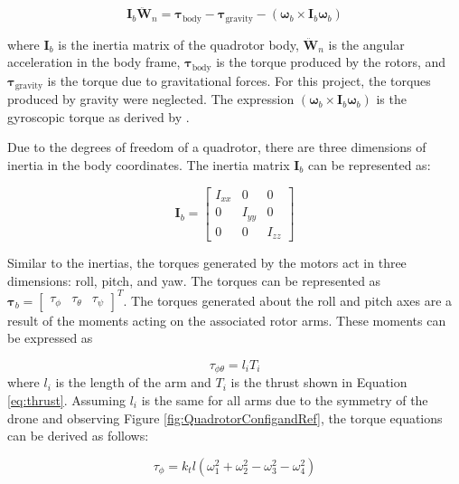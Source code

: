 \documentclass{UoNMCHA}
\numberwithin{equation}{section}
\begin{document}
\begin{equation}
    \mathbf{I}_b \ddot{\boldsymbol{W}}_n = \boldsymbol{\tau}_{\text{body}} - \boldsymbol{\tau}_{\text{gravity}} - \left( \boldsymbol{\omega}_b \times \mathbf{I}_b \boldsymbol{\omega}_b \right)
    \label{eq:MomentEq}
    \end{equation}
    
where \( \mathbf{I}_b \) is the inertia matrix of the quadrotor body, \( \ddot{\boldsymbol{W}}_n \) is the angular acceleration in the body frame, \( \boldsymbol{\tau}_{\text{body}} \) is the torque produced by the rotors, and \( \boldsymbol{\tau}_{\text{gravity}} \) is the torque due to gravitational forces. For this project, the torques produced by gravity were neglected. The expression \( \left( \boldsymbol{\omega}_b \times \mathbf{I}_b \boldsymbol{\omega}_b \right) \) is the gyroscopic torque as derived by \cite{website:AndrewGibian}.
    
Due to the degrees of freedom of a quadrotor, there are three dimensions of inertia in the body coordinates. The inertia matrix \( \mathbf{I}_b \) can be represented as:

\begin{equation}
\mathbf{I}_b = 
\begin{bmatrix}
I_{xx} & 0 & 0 \\
0 & I_{yy} & 0 \\
0 & 0 & I_{zz}
\end{bmatrix}
\end{equation}

Similar to the inertias, the torques generated by the motors act in three dimensions: roll, pitch, and yaw. The torques can be represented as \( \boldsymbol{\tau}_b = \begin{bmatrix} {\tau}_\phi & {\tau}_\theta & {\tau}_\psi \end{bmatrix}^T \). The torques generated about the roll and pitch axes are a result of the moments acting on the associated rotor arms. These moments can be expressed as 

\begin{equation}
\tau_{\phi\theta} = l_i T_i 
\end{equation}
where \( l_i \) is the length of the arm and \( T_i \) is the thrust shown in Equation \ref{eq:thrust}. Assuming \( l_i \) is the same for all arms due to the symmetry of the drone and observing Figure \ref{fig:QuadrotorConfigandRef}, the torque equations can be derived as follows:


\begin{equation}
\tau_{\phi} = k_t l (\omega_1^2 + \omega_2^2 - \omega_3^2 - \omega_4^2)
\end{equation}
\end{document}
